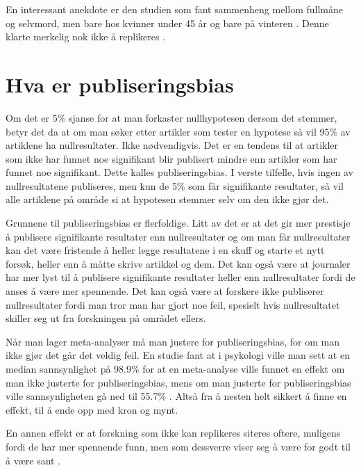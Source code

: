 \documentclass[doc,norsk]{apa7}
\begin{document}
En interessant anekdote er den studien som fant sammenheng mellom fullmåne og selvmord, men bare hos kvinner under 45 år og bare på vinteren \parencite{selvmord-vinter-2}. Denne klarte merkelig nok ikke å replikeres \parencite{selvmord-vinter}.

\section{Hva er publiseringsbias}
Om det er 5\% sjanse for at man forkaster nullhypotesen dersom det stemmer, betyr det da at om man søker etter artikler som tester en hypotese så vil 95\% av artiklene ha nullresultater. Ikke nødvendigvis. Det er en tendens til at artikler som ikke har funnet noe signifikant blir publisert mindre enn artikler som har funnet noe signifikant. Dette kalles publiseringsbias. I verste tilfelle, hvis ingen av nullresultatene publiseres, men kun de 5\% som får signifikante resultater, så vil alle artiklene på område si at hypotesen stemmer selv om den ikke gjør det.

Grunnene til publiseringsbias er flerfoldige. Litt av det er at det gir mer prestisje å publisere signifikante resultater enn nullresultater og om man får nullresultater kan det være fristende å heller legge resultatene i en skuff og starte et nytt forsøk, heller enn å måtte skrive artikkel og  dem. Det kan også være at journaler har mer lyst til å publisere signifikante resultater heller enn nullresultater fordi de anses å være mer spennende. Det kan også være at forskere ikke publiserer nullresultater fordi man tror man har gjort noe feil, spesielt hvis nullresultatet skiller seg ut fra forskningen på området ellers.

Når man lager meta-analyser må man justere for publiseringsbias, for om man ikke gjør det går det veldig feil. En studie fant at i psykologi ville man sett at en median sannsynlighet på 98.9\% for at en meta-analyse ville funnet en effekt om man ikke justerte for publiseringsbias, mens om man justerte for publiseringsbias ville sannsynligheten gå ned til 55.7\% \parencite{publiseringsbias-psykologi}. Altså fra å nesten helt sikkert å finne en effekt, til å ende opp med kron og mynt.

En annen effekt er at forskning som ikke kan replikeres siteres oftere, muligens fordi de har mer spennende funn, men som dessverre viser seg å være for godt til å være sant \parencite{falsk-sitert-mer}.
\end{document}
